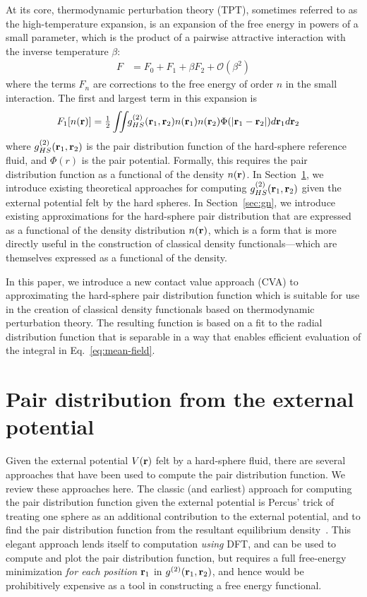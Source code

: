At its core, thermodynamic perturbation theory (TPT), sometimes referred to
as the high-temperature expansion, is an expansion of the
free energy in powers of a small parameter, which is the
product of a
pairwise attractive interaction with the inverse temperature $\beta$:
\begin{align}
  F &= F_0 + F_1 + \beta F_2 + \mathcal{O}(\beta^2)
\end{align}
where the terms $F_n$ are corrections to the free energy of order $n$
in the small interaction.  The first and largest term in this
expansion is
\begin{align}
  F_1[n(\textbf{r})] &= \tfrac12 \iint \!\!
  g^{(2)}_{HS}(\textbf{r}_1,\textbf{r}_2)n(\textbf{r}_1)n(\textbf{r}_2)\Phi(|\textbf{r}_1-\textbf{r}_2|)
  d\textbf{r}_1d\textbf{r}_2
  \label{eq:mean-field}
\end{align}
where $g^{(2)}_{HS}(\textbf{r}_1,\textbf{r}_2)$ is the pair distribution function of
the hard-sphere reference fluid, and $\Phi(r)$ is the pair potential.
Formally, this requires the pair distribution function as a functional
of the density $n(\textbf{r})$.  In Section~\ref{sec:gV}, we introduce
existing theoretical approaches for computing
$g^{(2)}_{HS}(\textbf{r}_1,\textbf{r}_2)$ given the external potential felt by the
hard spheres.  In Section~\ref{sec:gn}, we introduce existing
approximations for the hard-sphere pair distribution that are
expressed as a functional of the density distribution $n(\textbf{r})$, which
is a form that is more directly useful in the construction of
classical density functionals---which are themselves expressed as a
functional of the density.

In this paper, we introduce a new contact value approach
(CVA) to approximating the hard-sphere pair distribution function
which is suitable for use in the creation of classical density
functionals based on thermodynamic perturbation theory. The resulting
function is based on a fit to the radial distribution function that is
separable in a way that enables efficient evaluation of the
integral in Eq.~\ref{eq:mean-field}.

\section{Pair distribution from the external potential}\label{sec:gV}

Given the external potential $V(\textbf{r})$ felt by a hard-sphere fluid,
there are several approaches that have been used to compute the pair
distribution function.  We review these approaches here.  The
classic (and earliest) approach for computing the pair distribution
function given the external potential is Percus' trick of treating one
sphere as an additional contribution to the external potential, and to
find the pair distribution function from the resultant equilibrium
density~\cite{hansen2006theory}.  This elegant approach lends itself
to computation \emph{using} DFT, and can be used to compute and plot the pair
distribution function, but requires a full free-energy minimization
\emph{for each position} $\textbf{r}_1$ in $g^{(2)}(\textbf{r}_1,\textbf{r}_2)$, and hence
would be prohibitively expensive as a tool in constructing a free
energy functional.

